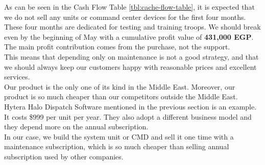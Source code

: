 As can be seen in the Cash  Flow  Table \ref{tbl:cache-flow-table}, it is expected that we do not sell any units or command center devices for the first four months. These four months are dedicated for testing and training troops. We should break even by the beginning of May with a cumulative profit value of \textbf{431,000 EGP}. The main profit contribution comes from the purchase, not the support.
\\
This means that depending only on maintenance is not a good strategy, and that we should always keep our customers happy with reasonable prices and excellent services.
\\
Our product is the only one of its kind in the Middle East. Moreover, our product is so much cheaper than our competitors outside the Middle East. Hytera Halo Dispatch Software mentioned in the previous section is an example. It costs \$999 per unit per year. They also adopt a different business model and they depend more on the annual subscription.
\\
In our case, we build the system unit or CMD and sell it one time with a maintenance subscription, which is so much cheaper than selling annual subscription used by other companies.
